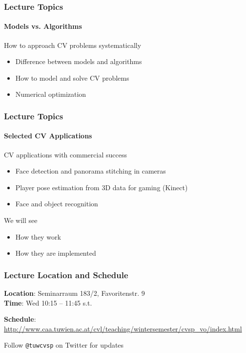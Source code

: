 \documentclass[xetex,professionalfont]{beamer}
\begin{document}

\begin{frame}
\frametitle{Lecture Topics}
\framesubtitle{Models vs. Algorithms}

How to approach CV problems systematically
\begin{itemize}
	\item Difference between models and algorithms
	\item How to model and solve CV problems
	\item Numerical optimization
\end{itemize}

\end{frame}


\begin{frame}
\frametitle{Lecture Topics}
\framesubtitle{Selected CV Applications}

CV applications with commercial success
\begin{itemize}
	\item Face detection and panorama stitching in cameras
	\item Player pose estimation from 3D data for gaming (Kinect)
	\item Face and object recognition
\end{itemize}

\bigskip
We will see
\begin{itemize}
	\item How they work
	\item How they are implemented
\end{itemize}

\end{frame}


\begin{frame}
\frametitle{Lecture Location and Schedule}

\textbf{Location}: Seminarraum 183/2, Favoritenstr. 9\\
\textbf{Time}: Wed 10:15 -- 11:45 s.t.

\bigskip
\textbf{Schedule}: \url{http://www.caa.tuwien.ac.at/cvl/teaching/wintersemester/cvsp_vo/index.html}

\bigskip
Follow \texttt{@tuwcvsp} on Twitter for updates

\end{frame}
\end{document}
